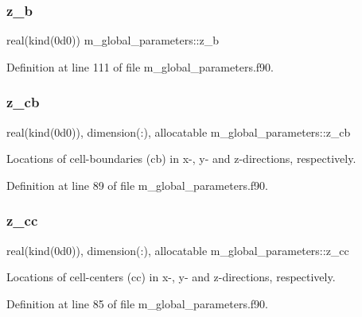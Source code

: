 \subsubsection{\texorpdfstring{z\+\_\+b}{z\_b}}
{\footnotesize\ttfamily real(kind(0d0)) m\+\_\+global\+\_\+parameters\+::z\+\_\+b}



Definition at line 111 of file m\+\_\+global\+\_\+parameters.\+f90.

\mbox{\label{namespacem__global__parameters_a1f932e794cad6291b2e6c62b93dcf533}} 
\subsubsection{\texorpdfstring{z\+\_\+cb}{z\_cb}}
{\footnotesize\ttfamily real(kind(0d0)), dimension(\+:), allocatable m\+\_\+global\+\_\+parameters\+::z\+\_\+cb}



Locations of cell-\/boundaries (cb) in x-\/, y-\/ and z-\/directions, respectively. 



Definition at line 89 of file m\+\_\+global\+\_\+parameters.\+f90.

\mbox{\label{namespacem__global__parameters_a2c4b9e99b981dc55cccf0b153159404e}} 
\subsubsection{\texorpdfstring{z\+\_\+cc}{z\_cc}}
{\footnotesize\ttfamily real(kind(0d0)), dimension(\+:), allocatable m\+\_\+global\+\_\+parameters\+::z\+\_\+cc}



Locations of cell-\/centers (cc) in x-\/, y-\/ and z-\/directions, respectively. 



Definition at line 85 of file m\+\_\+global\+\_\+parameters.\+f90.

\mbox{\label{namespacem__global__parameters_a4b6341f4ce0cc9c395b4791549357efc}} 
